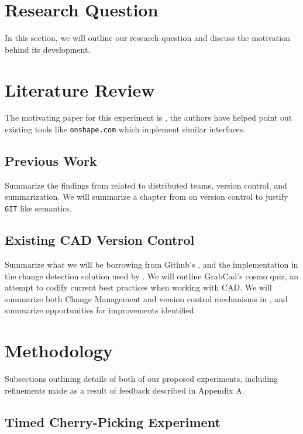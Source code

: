 \documentclass[sigconf,authorversion,nonacm]{acmart}
\begin{document}
\section{Research Question}

In this section, we will outline our research question and discuss the motivation behind its development.
\section{Literature Review}

The motivating paper for this experiment is \citet{cheng2023age}, the authors have helped point out existing tools like \texttt{onshape.com} which implement similar interfaces.

\subsection{Previous Work}
Summarize the findings from \citet{cheng2023age} related to distributed teams, version control, and summarization.
We will summarize a chapter from \citet{Frazelle_2021} on version control to justify \texttt{GIT} like semantics.

\subsection{Existing CAD Version Control}
Summarize what we will be borrowing from Github's \citet{github_blog_2013}, and the implementation in the change detection solution used by \citet{3drepo_blog}.
We will outline GrabCad's cosmo quiz\cite{revisions_2014}, an attempt to codify current best practices when working with CAD.
We will summarize both Change Management and version control mechanisms in \citet{Bricogne_Rivest_Troussier_Eynard_2012}, and summarize opportunities for improvements identified.

\section{Methodology}

Subsections outlining details of both of our proposed experiments, including refinements made as a result of feedback described in Appendix A.

\subsection{Timed Cherry-Picking Experiment}
\end{document}
